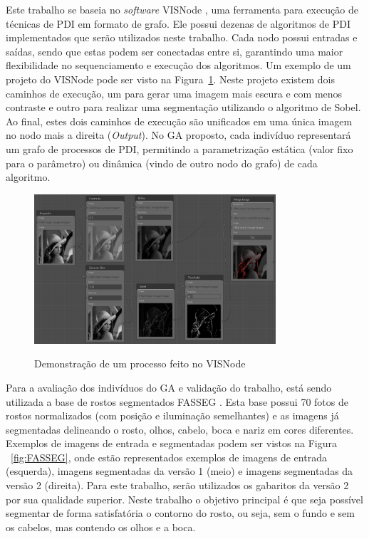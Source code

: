 \documentclass[12pt,oneside,a4paper,english,french,spanish,brazil,]{abntex2}
\begin{document}
Este trabalho se baseia no \textit{software} VISNode \cite{visnode:2018}, uma ferramenta para execução de técnicas de PDI em formato de grafo. Ele possui dezenas de algoritmos de PDI implementados que serão utilizados neste trabalho. Cada nodo possui entradas e saídas, sendo que estas podem ser conectadas entre si, garantindo uma maior flexibilidade no sequenciamento e execução dos algoritmos. Um exemplo de um projeto do VISNode pode ser visto na Figura~\ref{fig:PRO_Visnode}. Neste projeto existem dois caminhos de execução, um para gerar uma imagem mais escura e com menos contraste e outro para realizar uma segmentação utilizando o algoritmo de Sobel. Ao final, estes dois caminhos de execução são unificados em uma única imagem no nodo mais a direita (\textit{Output}). No GA proposto, cada indivíduo representará um grafo de processos de PDI, permitindo a parametrização estática (valor fixo para o parâmetro) ou dinâmica (vindo de outro nodo do grafo) de cada algoritmo.

\begin{figure}[ht]
\centering
\caption{Demonstração de um processo feito no VISNode}
\includegraphics[width=0.8\textwidth]{imagens/PRO_Visnode.PNG}
\sourceAuthor
\label{fig:PRO_Visnode}
\end{figure}

Para a avaliação dos indivíduos do GA e validação do trabalho, está sendo utilizada a base de rostos segmentados FASSEG \cite{fasseg:2018}. Esta base possui 70 fotos de rostos normalizados (com posição e iluminação semelhantes) e as imagens já segmentadas delineando o rosto, olhos, cabelo, boca e nariz em cores diferentes. Exemplos de imagens de entrada e segmentadas podem ser vistos na Figura ~\ref{fig:FASSEG}, onde estão representados exemplos de imagens de entrada (esquerda), imagens segmentadas da versão 1 (meio) e imagens segmentadas da versão 2 (direita). Para este trabalho, serão utilizados os gabaritos da versão 2 por sua qualidade superior. Neste trabalho o objetivo principal é que seja possível segmentar de forma satisfatória o contorno do rosto, ou seja, sem o fundo e sem os cabelos, mas contendo os olhos e a boca.
\end{document}
